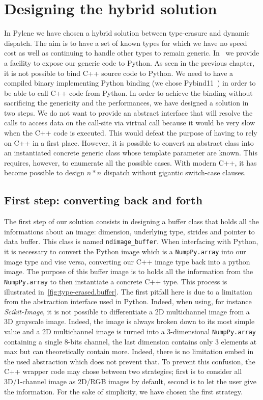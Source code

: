 \section{Designing the hybrid solution}

In Pylene we have chosen a hybrid solution between type-erasure and dynamic dispatch. The aim is to have a set of known
types for which we have no speed cost as well as continuing to handle other types to remain generic.
In~\cite{gossec.2019.pybind} we provide a facility to expose our generic code to Python. As seen in the previous
chapter, it is not possible to bind C++ source code to Python. We need to have a compiled binary implementing Python
binding (we chose Pybind11~\parencite{jakob.2017.pybind11}) in order to be able to call C++ code from Python. In order
to achieve the binding without sacrificing the genericity and the performances, we have designed a solution in two
steps. We do not want to provide an abstract interface that will resolve the calls to access data on the call-site via
virtual call because it would be very slow when the C++ code is executed. This would defeat the purpose of having to
rely on C++ in a first place. However, it is possible to convert an abstract class into an instantiated concrete generic
class whose template parameter are known. This requires, however, to enumerate all the possible cases. With modern C++,
it has become possible to design $n*n$ dispatch without gigantic switch-case clauses.


\subsection{First step: converting back and forth}

The first step of our solution consists in designing a buffer class that holds all the informations about an image:
dimension, underlying type, strides and pointer to data buffer. This class is named \texttt{ndimage\_buffer}. When
interfacing with Python, it is necessary to convert the Python image which is a \texttt{NumpPy.array} into our image
type and vise versa, converting our C++ image type back into a python image. The purpose of this buffer image is to
holds all the information from the \texttt{NumpPy.array} to then instantiate a concrete C++ type. This process is
illustrated in~\cref{fig:type-erased.buffer}. The first pitfall here is due to a limitation from the abstraction
interface used in Python. Indeed, when using, for instance \emph{Scikit-Image}, it is not possible to differentiate a 2D
multichannel image from a 3D grayscale image. Indeed, the image is always broken down to its most simple value and a 2D
multichannel image is turned into a 3-dimensional \texttt{NumpPy.array} containing a single 8-bits channel, the last
dimension contains only 3 elements at max but can theoretically contain more. Indeed, there is no limitation embed in
the used abstraction which does not prevent that. To prevent this confusion, the C++ wrapper code may chose between two
strategies; first is to consider all 3D/1-channel image as 2D/RGB images by default, second is to let the user give the
information. For the sake of simplicity, we have chosen the first strategy.

